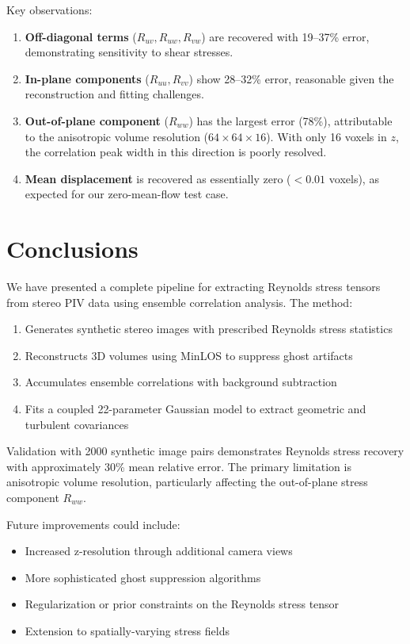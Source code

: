 \documentclass[11pt,a4paper]{article}
\begin{document}
Key observations:
\begin{enumerate}
    \item \textbf{Off-diagonal terms} ($R_{uv}, R_{uw}, R_{vw}$) are recovered with 19--37\% error, demonstrating sensitivity to shear stresses.

    \item \textbf{In-plane components} ($R_{uu}, R_{vv}$) show 28--32\% error, reasonable given the reconstruction and fitting challenges.

    \item \textbf{Out-of-plane component} ($R_{ww}$) has the largest error (78\%), attributable to the anisotropic volume resolution ($64 \times 64 \times 16$). With only 16 voxels in $z$, the correlation peak width in this direction is poorly resolved.

    \item \textbf{Mean displacement} is recovered as essentially zero ($< 0.01$ voxels), as expected for our zero-mean-flow test case.
\end{enumerate}

\section{Conclusions}

We have presented a complete pipeline for extracting Reynolds stress tensors from stereo PIV data using ensemble correlation analysis. The method:

\begin{enumerate}
    \item Generates synthetic stereo images with prescribed Reynolds stress statistics
    \item Reconstructs 3D volumes using MinLOS to suppress ghost artifacts
    \item Accumulates ensemble correlations with background subtraction
    \item Fits a coupled 22-parameter Gaussian model to extract geometric and turbulent covariances
\end{enumerate}

Validation with 2000 synthetic image pairs demonstrates Reynolds stress recovery with approximately 30\% mean relative error. The primary limitation is anisotropic volume resolution, particularly affecting the out-of-plane stress component $R_{ww}$.

Future improvements could include:
\begin{itemize}
    \item Increased z-resolution through additional camera views
    \item More sophisticated ghost suppression algorithms
    \item Regularization or prior constraints on the Reynolds stress tensor
    \item Extension to spatially-varying stress fields
\end{itemize}
\end{document}

